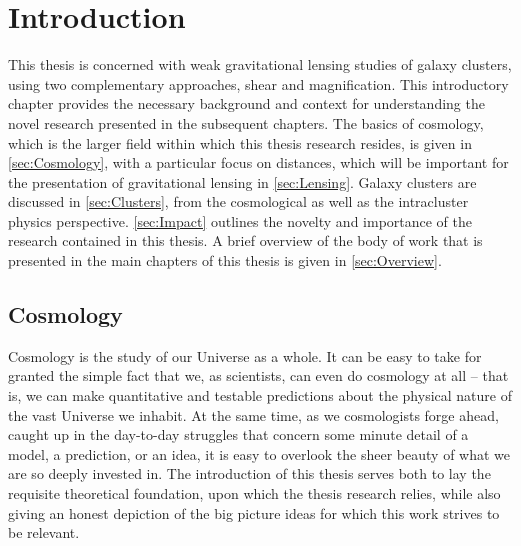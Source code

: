 
\chapter{Introduction}
\label{ch:Introduction}



This thesis is concerned with weak gravitational lensing studies of galaxy clusters, using two complementary approaches, shear and magnification. This introductory chapter provides the necessary background and context for understanding the novel research presented in the subsequent chapters. The basics of cosmology, which is the larger field within which this thesis research resides, is given in \autoref{sec:Cosmology}, with a particular focus on distances, which will be important for the presentation of gravitational lensing in \autoref{sec:Lensing}. Galaxy clusters are discussed in \autoref{sec:Clusters}, from the cosmological as well as the intracluster physics perspective. \autoref{sec:Impact} outlines the novelty and importance of the research contained in this thesis. A brief overview of the body of work that is presented in the main chapters of this thesis is given in \autoref{sec:Overview}.

\section{Cosmology}
\label{sec:Cosmology}

Cosmology is the study of our Universe as a whole. It can be easy to take for granted the simple fact that we, as scientists, can even do cosmology at all -- that is, we can make quantitative and testable predictions about the physical nature of the vast Universe we inhabit. At the same time, as we cosmologists forge ahead, caught up in the day-to-day struggles that concern some minute detail of a model, a prediction, or an idea, it is easy to overlook the sheer beauty of what we are so deeply invested in. The introduction of this thesis serves both to lay the requisite theoretical foundation, upon which the thesis research relies, while also giving an honest depiction of the big picture ideas for which this work strives to be relevant.

